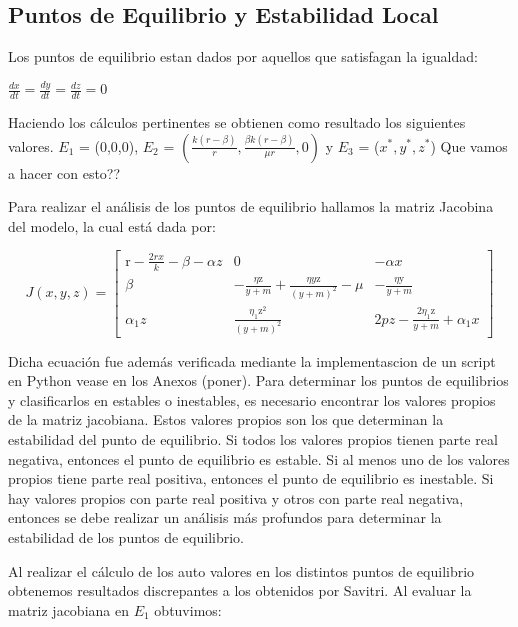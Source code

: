 \documentclass{wscpaperproc}
\theoremstyle{wsc}
\begin{document}
\subsection{Puntos de Equilibrio y Estabilidad Local}
Los puntos de equilibrio estan dados por aquellos que satisfagan la igualdad:
\begin{center}
	$\frac{dx}{dt} = \frac{dy}{dt} = \frac{dz}{dt} = 0$
\end{center}
Haciendo los c\'alculos pertinentes se obtienen como resultado los siguientes valores.
$E_1$ = (0,0,0), $E_2$ = $(\frac{k(r-\beta)}{r}, \frac{\beta k(r-\beta)}{\mu r}, 0)$ y $E_3$ = ($x^*,y^*,z^*$) Que vamos a hacer con esto??

Para realizar el análisis de los puntos de equilibrio hallamos la matriz Jacobina del modelo, la cual está dada por:

\begin{equation} \label{JacobianoEstability}
	J\left(x, y, z\right)=\left[\begin{array}{ccc}
			\mathrm{r}-\frac{2 r x}{k}-\beta-\alpha z & 0                                                                  & -\alpha x                                        \\
			\beta                                     & -\frac{\eta \mathrm{z}}{y+m}+\frac{\eta y \mathrm{z}}{(y+m)^2}-\mu & -\frac{\eta \mathrm{y}}{y+m}                     \\
			\alpha_1 z                                & \frac{\eta_1 \mathrm{z}^2}{(y+m)^2}                                & 2 p z-\frac{2 \eta_1 \mathrm{z}}{y+m}+\alpha_1 x
		\end{array}\right]
\end{equation}

Dicha ecuación fue además verificada mediante la implementascion de un script en Python vease en los Anexos (poner).
Para determinar los puntos de equilibrios y clasificarlos en estables o inestables, es necesario encontrar los valores propios 
de la matriz jacobiana. Estos valores propios son los que determinan la estabilidad del punto de equilibrio. Si todos los valores 
propios tienen parte real negativa, entonces el punto de equilibrio es estable. Si al menos uno de los valores propios tiene parte real positiva, 
entonces el punto de equilibrio es inestable. Si hay valores propios con parte real positiva y otros con parte real negativa, 
entonces se debe realizar un análisis más profundos para determinar la estabilidad de los puntos de equilibrio. \par
Al realizar el c\'alculo de los auto valores en los distintos puntos de equilibrio obtenemos resultados discrepantes a los obtenidos por Savitri. Al evaluar la matriz jacobiana en $E_1$ obtuvimos:\\
\end{document}
